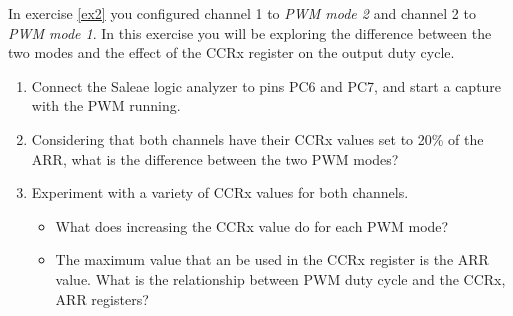 \documentclass[openany,11pt,fleqn]{book} %
\begin{document}
\begin{exercise}
    In exercise \ref{ex2} you configured channel 1 to \textit{PWM mode 2} and channel 2 to \textit{PWM mode 1}. In this exercise you will be exploring the difference between the two modes and the effect of the CCRx register on the output duty cycle. 
    
    \begin{enumerate}
        \item Connect the Saleae logic analyzer to pins PC6 and PC7, and start a capture with the PWM running.
        \item Considering that both channels have their CCRx values set to 20\% of the ARR, what is the difference between the two PWM modes?
        \item Experiment with a variety of CCRx values for both channels. 
        \begin{itemize}
            \item What does increasing the CCRx value do for each PWM mode?
            \item The maximum value that an be used in the CCRx register is the ARR value. What is the relationship between PWM duty cycle and the CCRx, ARR registers?
        \end{itemize}
    \end{enumerate}
    
\end{exercise}
\end{document}

